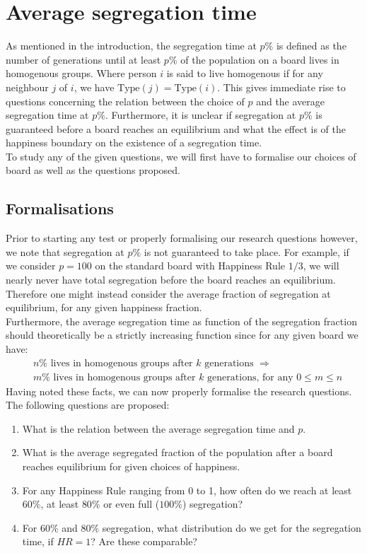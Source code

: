 
\section{Average segregation time}\label{sec:aveseg}
As mentioned in the introduction, the segregation time at \(p\%\) is defined as the number of generations until at least \(p\%\) of the population on a board lives in homogenous groups. 
Where person \(i\) is said to live homogenous if for any neighbour \(j\) of \(i\), we have \(\text{Type}(j)=\text{Type}(i)\).
This gives immediate rise to questions concerning the relation between the choice of \(p\) and the average segregation time at \(p\%\). 
Furthermore, it is unclear if segregation at \(p\%\) is guaranteed before a board reaches an equilibrium and what the effect is of the happiness boundary on the existence of a segregation time.\\

To study any of the given questions, we will first have to formalise our choices of board as well as the questions proposed.\\


\subsection{Formalisations}
Prior to starting any test or properly formalising our research questions however, we note that segregation at \(p\%\) is not guaranteed to take place.
For example, if we consider \(p=100\) on the standard board with Happiness Rule \(1/3\), we will nearly never have total segregation before the board reaches an equilibrium.
Therefore one might instead consider the average fraction of segregation at equilibrium, for any given happiness fraction. \\

Furthermore, the average segregation time as function of the segregation fraction should theoretically be a strictly increasing function since for any given board we have:
\begin{align*}
&n\% \text{ lives in homogenous groups after } k \text{ generations } \Rightarrow\\
& m\% \text{ lives in homogenous groups after } k \text{ generations, for any } 0 \leq m \leq n
\end{align*} 
Having noted these facts, we can now properly formalise the research questions.\\
The following questions are proposed:
\begin{enumerate}
 \item What is the relation between the average segregation time and \(p\).
 \item What is the average segregated fraction of the population after a board reaches equilibrium for given choices of happiness.
 \item For any Happiness Rule ranging from 0 to 1, how often do we reach at least $60\%$, at least $80\%$ or even full ($100\%$) segregation?
 \item For $60\%$ and $80\%$ segregation, what distribution do we get for the segregation time, if $HR = 1$? Are these comparable?
\end{enumerate}

